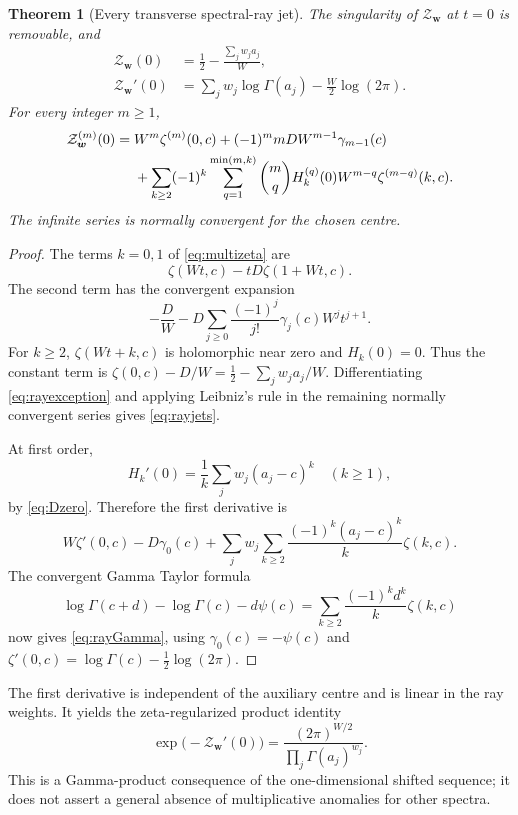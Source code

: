 \documentclass[11pt,a4paper]{article}
\numberwithin{equation}{section}
\newtheorem{theorem}{Theorem}[section]
\theoremstyle{definition}\newtheorem{definition}[theorem]{Definition}
\theoremstyle{remark}\newtheorem{remark}[theorem]{Remark}
\newcommand{\wv}{\boldsymbol w}
\begin{document}
\begin{theorem}[Every transverse spectral-ray jet]\label{thm:rays}
The singularity of $\mathcal Z_{\wv}$ at $t=0$ is removable, and
\begin{align}
 \mathcal Z_{\wv}(0)&=\frac12-\frac{\sum_jw_ja_j}{W},
 \label{eq:rayvalue}\\
 \mathcal Z_{\wv}'(0)&=\sum_jw_j\log\Gamma(a_j)
                                      -\frac W2\log(2\pi).
 \label{eq:rayGamma}
\end{align}
For every integer $m\ge1$,
\begin{align}
 \mathcal Z_{\wv}^{(m)}(0)
 ={}&W^m\zeta^{(m)}(0,c)
        +(-1)^m mD W^{m-1}\gamma_{m-1}(c)\notag\\
 &+\sum_{k\ge2}(-1)^k
     \sum_{q=1}^{\min(m,k)}\binom mq
             H_k^{(q)}(0)W^{m-q}\zeta^{(m-q)}(k,c).
 \label{eq:rayjets}
\end{align}
The infinite series is normally convergent for the chosen centre.
\end{theorem}
\begin{proof}
The terms $k=0,1$ of \eqref{eq:multizeta} are
\[
 \zeta(Wt,c)-tD\zeta(1+Wt,c).
\]
The second term has the convergent expansion
\begin{equation}
 -\frac DW-D\sum_{j\ge0}\frac{(-1)^j}{j!}
                         \gamma_j(c)W^jt^{j+1}.
 \label{eq:rayexception}
\end{equation}
For $k\ge2$, $\zeta(Wt+k,c)$ is holomorphic near zero and
$H_k(0)=0$. Thus the constant term is
$\zeta(0,c)-D/W=\tfrac12-\sum_jw_ja_j/W$.
Differentiating \eqref{eq:rayexception} and applying Leibniz's rule
in the remaining normally convergent series gives
\eqref{eq:rayjets}.

At first order,
\[
 H_k'(0)=\frac1k\sum_jw_j(a_j-c)^k\quad(k\ge1),
\]
by \eqref{eq:Dzero}. Therefore the first derivative is
\[
 W\zeta'(0,c)-D\gamma_0(c)
      +\sum_jw_j\sum_{k\ge2}\frac{(-1)^k(a_j-c)^k}{k}\zeta(k,c).
\]
The convergent Gamma Taylor formula
\[
 \log\Gamma(c+d)-\log\Gamma(c)-d\psi(c)
       =\sum_{k\ge2}\frac{(-1)^kd^k}{k}\zeta(k,c)
\]
now gives \eqref{eq:rayGamma}, using
$\gamma_0(c)=-\psi(c)$ and
$\zeta'(0,c)=\log\Gamma(c)-\tfrac12\log(2\pi)$.
\end{proof}

The first derivative is independent of the auxiliary centre and is
linear in the ray weights. It yields the zeta-regularized product identity
\begin{equation}
 \exp\bigl(-\mathcal Z_{\wv}'(0)\bigr)
       =\frac{(2\pi)^{W/2}}{\prod_j\Gamma(a_j)^{w_j}}.
 \label{eq:regularizedproduct}
\end{equation}
This is a Gamma-product consequence of the one-dimensional shifted
sequence; it does not assert a general absence of multiplicative
anomalies for other spectra.
\end{document}
